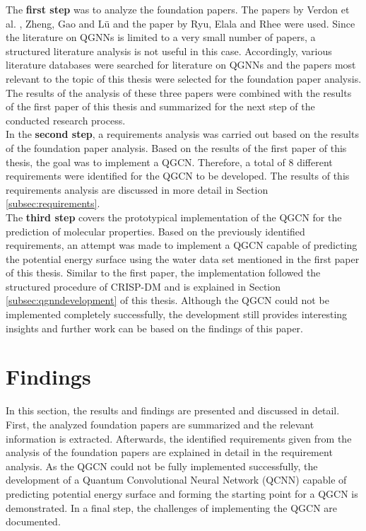 The \textbf{first step} was to analyze the foundation papers. The papers by Verdon et al. \cite{verdon_quantum_2019}, Zheng, Gao and Lü \cite{zheng2021quantum} and the paper by Ryu, Elala and Rhee \cite{ryu2023quantum} were used. Since the literature on QGNNs is limited to a very small number of papers, a structured literature analysis is not useful in this case. Accordingly, various literature databases were searched for literature on QGNNs and the papers most relevant to the topic of this thesis were selected for the foundation paper analysis. The results of the analysis of these three papers were combined with the results of the first paper of this thesis and summarized for the next step of the conducted research process. \\

In the \textbf{second step}, a requirements analysis was carried out based on the results of the foundation paper analysis. Based on the results of the first paper of this thesis, the goal was to implement a QGCN. Therefore, a total of 8 different requirements were identified for the QGCN to be developed. The results of this requirements analysis are discussed in more detail in Section \ref{subsec:requirements}. \\

The \textbf{third step} covers the prototypical implementation of the QGCN for the prediction of molecular properties. Based on the previously identified requirements, an attempt was made to implement a QGCN capable of predicting the potential energy surface using the water data set mentioned in the first paper of this thesis. Similar to the first paper, the implementation followed the structured procedure of CRISP-DM \cite{wirth2000crisp} and is explained in Section \ref{subsec:qgnndevelopment} of this thesis. Although the QGCN could not be implemented completely successfully, the development still provides interesting insights and further work can be based on the findings of this paper.

\section{Findings}
In this section, the results and findings are presented and discussed in detail. First, the analyzed foundation papers are summarized and the relevant information is extracted. Afterwards, the identified requirements given from the analysis of the foundation papers are explained in detail in the requirement analysis. As the QGCN could not be fully implemented successfully, the development of a Quantum Convolutional Neural Network (QCNN) capable of predicting potential energy surface and forming the starting point for a QGCN is demonstrated. In a final step, the challenges of implementing the QGCN are documented.

